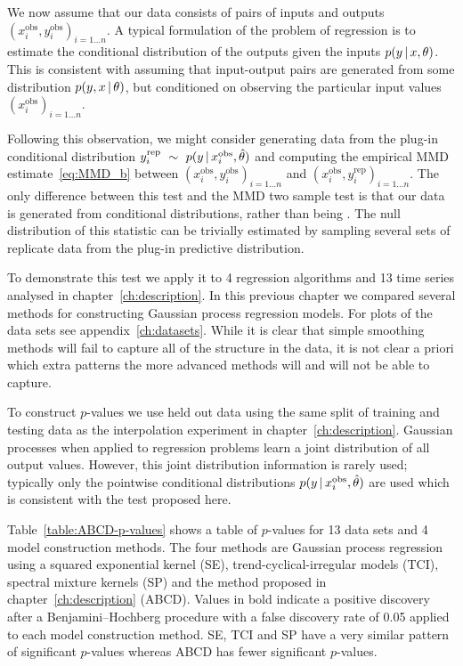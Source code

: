 We now assume that our data consists of pairs of inputs and outputs ${(x_i^\textrm{obs}, y_i^\textrm{obs})_{i=1\ldots n}}$.
A typical formulation of the problem of regression is to estimate the conditional distribution of the outputs given the inputs ${p(y\,|\, x, \theta)}$.
This is consistent with assuming that input-output pairs are generated \iid from some distribution ${p(y, x \,|\, \theta)}$, but conditioned on observing the particular input values ${(x_i^\textrm{obs})_{i=1\ldots n}}$.

Following this observation, we might consider generating data from the plug-in conditional distribution ${y_i^\textrm{rep} \ \sim\  p(y\,|\, x_i^\textrm{obs}, \hat\theta)}$ and computing the empirical MMD estimate~\eqref{eq:MMD_b} between ${(x_i^\textrm{obs}, y_i^\textrm{obs})_{i=1\ldots n}}$ and ${(x_i^\textrm{obs}, y_i^\textrm{rep})_{i=1\ldots n}}$.
The only difference between this test and the MMD two sample test is that our data is generated from conditional distributions, rather than being \iid.
The null distribution of this statistic can be trivially estimated by sampling several sets of replicate data from the plug-in predictive distribution.

To demonstrate this test we apply it to 4 regression algorithms and 13 time series analysed in chapter~\ref{ch:description}.
In this previous chapter we compared several methods for constructing Gaussian process regression models.
For plots of the data sets see appendix~\ref{ch:datasets}.
While it is clear that simple smoothing methods will fail to capture all of the structure in the data, it is not clear a priori which extra patterns the more advanced methods will and will not be able to capture.

To construct $p$-values we use held out data using the same split of training and testing data as the interpolation experiment in chapter~\ref{ch:description}.
Gaussian processes when applied to regression problems learn a joint distribution of all output values.
However, this joint distribution information is rarely used; typically only the pointwise conditional distributions ${p(y\,|\, x_i^\textrm{obs}, \hat\theta)}$ are used which is consistent with the test proposed here.

Table~\ref{table:ABCD-p-values} shows a table of $p$-values for 13 data sets and 4 model construction methods.
The four methods are Gaussian process regression using a squared exponential kernel (SE), trend-cyclical-irregular models \citep[e.g.][]{Lind2006-th} (TCI), spectral mixture kernels \citep{Wilson2013-eq} (SP) and the method proposed in chapter~\ref{ch:description} (ABCD).
Values in  bold indicate a positive discovery after a Benjamini--Hochberg \citep{Benjamini_undated-mh} procedure with a false discovery rate of 0.05 applied to each model construction method.
SE, TCI and SP have a very similar pattern of significant $p$-values whereas ABCD has fewer significant $p$-values.

